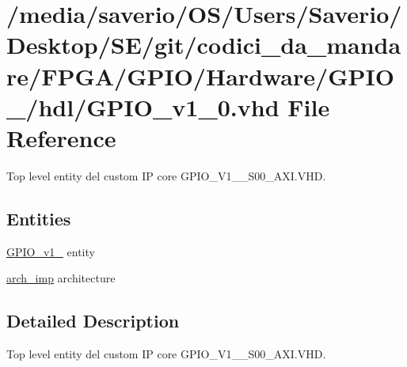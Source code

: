 \hypertarget{GPIO__v1__0_8vhd}{}\section{/media/saverio/\+O\+S/\+Users/\+Saverio/\+Desktop/\+S\+E/git/codici\+\_\+da\+\_\+mandare/\+F\+P\+G\+A/\+G\+P\+I\+O/\+Hardware/\+G\+P\+I\+O\+\_/hdl/\+G\+P\+I\+O\+\_\+v1\+\_\+0.vhd File Reference}
\label{GPIO__v1__0_8vhd}


Top level entity del custom IP core G\+P\+I\+O\+\_\+\+V1\+\_\+\_\+\+S00\+\_\+\+A\+X\+I.\+V\+HD.  


\subsection*{Entities}
\begin{DoxyCompactItemize}
\item 
\hyperlink{classGPIO__v1__0}{G\+P\+I\+O\+\_\+v1\+\_} entity
\item 
\hyperlink{classGPIO__v1__0_1_1arch__imp}{arch\+\_\+imp} architecture
\end{DoxyCompactItemize}


\subsection{Detailed Description}
Top level entity del custom IP core G\+P\+I\+O\+\_\+\+V1\+\_\+\_\+\+S00\+\_\+\+A\+X\+I.\+V\+HD. 


